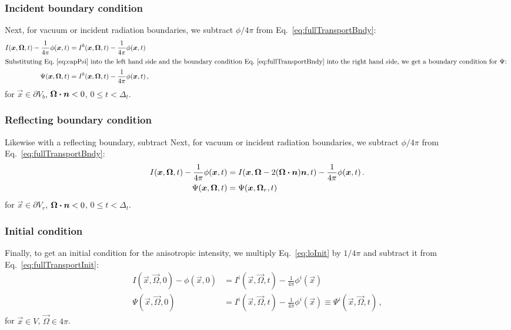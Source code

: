 \subsubsection{Incident boundary condition}
Next, for vacuum or incident radiation boundaries, we subtract $\phi/4\pi$ from 
Eq.~\eqref{eq:fullTransportBndy}:
\begin{align}\nonumber
  I(\vec{x}, \vec{\Omega}, t) - \frac{1}{4\pi} \phi(\vec{x}, t)
  &= I^b(\vec{x}, \vec{\Omega}, t) - \frac{1}{4\pi} \phi(\vec{x}, t)
  \\ 
  \intertext{Substituting Eq.~\eqref{eq:capPsi} into the left hand side and the
  boundary condition Eq.~\eqref{eq:fullTransportBndy} into the right hand side,
  we get a boundary condition for $\Psi$:
  } \label{eq:capPsiBndy}
 \Psi(\vec{x}, \vec{\Omega}, t) 
  &=I^b(\vec{x}, \vec{\Omega}, t) - \frac{1}{4\pi} \phi(\vec{x}, t)\,,
\end{align}
for $\vec{x} \in \partial V_b$, $\vec{\Omega} \vd \vec{n} < 0$,
$0 \le t < \Delta_t$.

\subsubsection{Reflecting boundary condition}
Likewise with a reflecting boundary, subtract 
Next, for vacuum or incident radiation boundaries, we subtract $\phi/4\pi$ from 
Eq.~\eqref{eq:fullTransportBndy}:
\begin{align}\nonumber
  I(\vec{x}, \vec{\Omega}, t) - \frac{1}{4\pi} \phi(\vec{x}, t)
  &= I(\vec{x}, \vec{\Omega} - 2(\vec{\Omega} \vd \vec{n}) \vec{n}, t)
   - \frac{1}{4\pi} \phi(\vec{x}, t)\,.
  \\ \label{eq:capPsiRefl}
 \Psi(\vec{x}, \vec{\Omega}, t) 
  &= \Psi(\vec{x}, \vec{\Omega}_r, t)
\end{align}
for $\vec{x} \in \partial V_r$, $\vec{\Omega} \vd \vec{n} < 0$,
$0 \le t < \Delta_t$.

\subsubsection{Initial condition}
Finally, to get an initial condition for the anisotropic intensity, we
multiply Eq.~\eqref{eq:loInit} by $1/4\pi$ and subtract it from
Eq.~\eqref{eq:fullTransportInit}:
\begin{align}\nonumber
 I(\vec{x}, \vec{\Omega}, 0) - \phi(\vec{x}, 0)
 &= I^i(\vec{x}, \vec{\Omega}, t) - \frac1{4\pi} \phi^i(\vec{x})
 \\ \label{eq:capPsiInit}
 \Psi(\vec{x}, \vec{\Omega}, 0)
 &= I^i(\vec{x}, \vec{\Omega}, t) - \frac1{4\pi} \phi^i(\vec{x})
 \equiv \Psi^i(\vec{x}, \vec{\Omega}, t)
 \,,
\end{align}
for $\vec{x} \in V$, $\vec{\Omega} \in 4\pi$.

